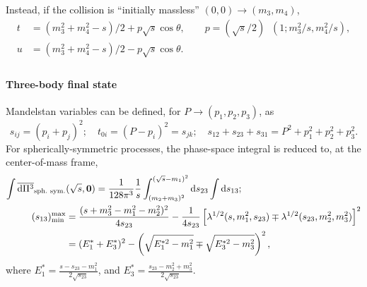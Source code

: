 \documentclass[CheatSheet]{subfiles}
\begin{document}
\noindent
Instead, if the collision is ``initially massless'' $(0,0)\to (m_3,m_4)$,
\begin{align*}
 t &= (m_3^2+m_4^2-s)/2+p\sqrt{s}\cos\theta,\qquad
 p = (\sqrt{s}/2)\mathop{\lambda^{1/2}}\left(1;m_3^2/s,{m_4^2}/{s}\right),\\
 u &= (m_3^2+m_4^2-s)/2-p\sqrt{s}\cos\theta.\\
\end{align*}

\paragraph{Three-body final state} Mandelstan variables can be defined, for $P\to(p_1,p_2,p_3)$, as
\begin{equation*}
s_{ij}=(p_i+p_j)^2;\quad t_{0i}=(P-p_i)^2=s_{jk};\quad s_{12}+s_{23}+s_{31}=P^2+p_1^2+p_2^2+p_3^2.
\end{equation*}
For spherically-symmetric processes, the phase-space integral is reduced to, at the center-of-mass frame,
\begin{align}
\int\overline{\mathop{}\!\mathrm{d}\Pi^3}_{\text{sph.\ sym.}}&(\sqrt{s}, {\boldsymbol{0}})
=\frac{1}{128\pi^3}\frac{1}{s}
\int_{(m_2+m_3)^2}^{(\sqrt{s}-m_1)^2}\mathop{}\!\mathrm{d} s_{23}\int\mathop{}\!\mathrm{d} s_{13};
\\ (s_{13})^{\text{max}}_{\text{min}} &=
\frac{(s+m_3^2-m_1^2-m_2^2)^2}{4s_{23}}
-\frac{1}{4s_{23}}
\left[\lambda^{1/2}(s,m_1^2,s_{23})\mp\lambda^{1/2}(s_{23},m_2^2,m_3^2)\right]^2
\\&=(E_1^*+E_3^*)^2-\left(\sqrt{E_1^{*2}-m_1^2}\mp\sqrt{E_3^{*2}-m_3^2}\right)^2,
\quad
\end{align}
where 
$E_1^*=\frac{s-s_{23}-m_1^2}{2\sqrt{s_{23}}}$, and
$E_3^*=\frac{s_{23}-m_2^2+m_3^2}{2\sqrt{s_{23}}}$.


\newpage

\detailstyle
\end{document}
